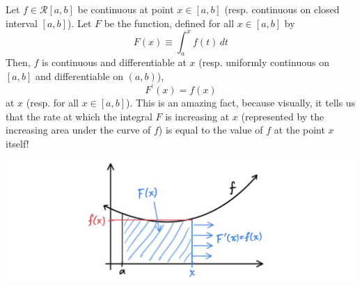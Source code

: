 \documentclass{article}
\begin{document}
      \begin{theorem}
      Let $f \in \mathcal{R}[a, b]$ be continuous at point $x \in [a, b]$ (resp. continuous on closed interval $[a, b]$). Let $F$ be the function, defined for all $x \in [a, b]$ by 
      \[F(x) \equiv \int_a^x f(t)\,dt\]
      Then, $f$ is continuous and differentiable at $x$ (resp. uniformly continuous on $[a, b]$ and differentiable on $(a, b)$), 
      \[F^\prime (x) = f(x)\]
      at $x$ (resp. for all $x \in [a, b]$). This is an amazing fact, because visually, it tells us that the rate at which the integral $F$ is increasing at $x$ (represented by the increasing area under the curve of $f$) is equal to the value of $f$ at the point $x$ itself! 
      \begin{center}
          \includegraphics[scale=0.25]{img/First_Fundamental_Theorem_Analysis.jpg}
      \end{center}
      \end{theorem}
\end{document}
